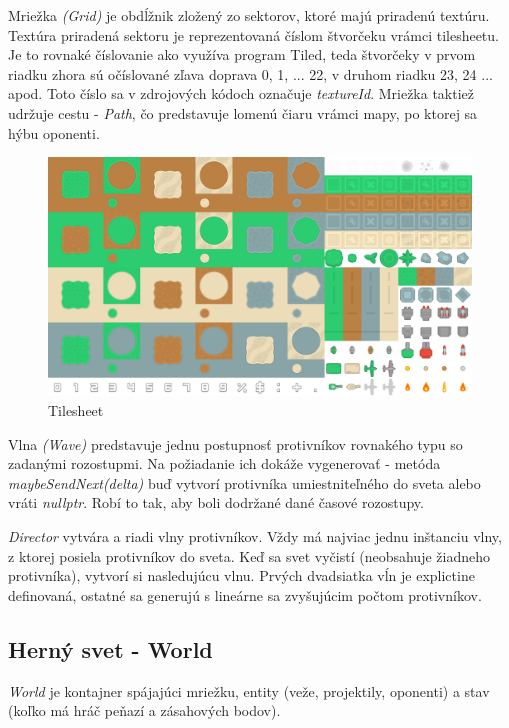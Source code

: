 \documentclass[12pt]{article}
\begin{document}
Mriežka \emph{(Grid)} je obdĺžnik zložený zo sektorov, ktoré majú priradenú textúru. Textúra priradená sektoru je 
reprezentovaná číslom štvorčeku vrámci tilesheetu. Je to rovnaké číslovanie ako využíva program Tiled, teda štvorčeky
v prvom riadku zhora sú očíslované zľava doprava 0, 1, ... 22, v druhom riadku 23, 24 ... apod. Toto číslo sa v zdrojových
kódoch označuje \emph{textureId}. Mriežka taktiež udržuje cestu - \emph{Path},
čo predstavuje lomenú čiaru vrámci mapy, po ktorej sa hýbu oponenti.

\begin{figure}[h]
    \includegraphics[width=\textwidth]{images/towerDefense_tilesheet.png}
    \caption{Tilesheet}
\end{figure}

Vlna \emph{(Wave)} predstavuje jednu postupnosť protivníkov rovnakého typu so zadanými rozostupmi.
Na požiadanie ich dokáže vygenerovať - metóda \emph{maybeSendNext(delta)} buď vytvorí protivníka umiestniteľného do sveta
alebo vráti \emph{nullptr}. Robí to tak, aby boli dodržané dané časové rozostupy.


\emph{Director} vytvára a riadi vlny protivníkov. Vždy má najviac jednu inštanciu vlny, z ktorej posiela protivníkov do sveta.
Keď sa svet vyčistí (neobsahuje žiadneho protivníka), vytvorí si nasledujúcu vlnu. Prvých dvadsiatka vĺn je explictine definovaná,
ostatné sa generujú s lineárne sa zvyšujúcim počtom protivníkov.

\subsection{Herný svet - World}

\emph{World} je kontajner spájajúci mriežku, entity (veže, projektily, oponenti) a stav (koľko má hráč peňazí a zásahových bodov).
\end{document}
